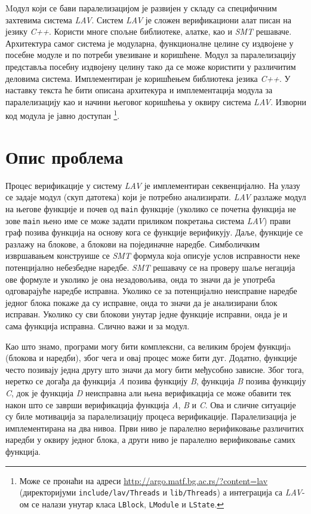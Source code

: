 \documentclass[12pt,oneside]{memoir}
\begin{document}
Mодул који се бави паралелизацијом је развијен у складу са специфичним захтевима система \textit{LAV}. Систем \textit{LAV} је сложен верификациони алат писан на језику \textit{C++}. Користи многе спољне библиотеке, алатке, као и \textit{SMT} решаваче.  Архитектура самог система је модуларна, функционалне целине су издвојене у посебне модуле и по потреби увезиване и коришћене. Модул за паралелизацију представља посебну издвојену целину тако да се може користити у различитим деловима система. Имплементиран је коришћењем библиотека језика \textit{C++}. У наставку текста ће бити описана архитекура и имплементација модула за паралелизацију као и начини његовог коришћења у оквиру система \textit{LAV}. Изворни код модула је јавно доступан \footnote{Може се пронаћи на адреси \url{http://argo.matf.bg.ac.rs/?content=lav} (директоријуми \texttt{include/lav/Threads} и \texttt{lib/Threads}) а интеграција са \textit{LAV}-ом се налази унутар класа \texttt{LBlock}, \texttt{LModule} и \texttt{LState}.}.  

\section{Опис проблема}
Процес верификације у систему \textit{LAV} је имплементиран секвенцијално. На улазу се задаје модул (скуп датотека) који је потребно анализирати.  \textit{LAV} разлаже модул на његове функције и почев од \texttt{main} функције (уколико се почетна функција не зове \texttt{main} њено име се може задати приликом покретања система \textit{LAV}) прави граф позива функција  на основу кога се функције верификују. Даље, функције се разлажу на блокове, а блокови на појединачне наредбе. Симболичким извршавањем конструише се \textit{SMT} формула која описује услов исправности неке потенцијално небезбедне наредбе. \textit{SMT} решавачу се на проверу шаље негација ове формуле и уколико је она незадовољива, онда то значи да је употреба одговарајуће наредбе исправна. Уколико се за потенцијално неисправне наредбе једног блока покаже да су исправне, онда то значи да је анализирани блок исправан. Уколико су сви блокови унутар једне функције исправни, онда је и сама функција исправна. Слично важи и за модул. 

Као што знамо, програми могу бити комплексни, са великим бројем функцијa (блокова и наредби), због чега и овај процес може бити дуг. Додатно, функције често позивају једна другу што значи да могу бити међусобно зависне. Због тога, неретко се догађа да функција \textit{A} позива функцију \textit{B}, функција \textit{B} позива функцију \textit{C}, док је функција \textit{D} неисправна али њена верификација се може обавити тек након што се заврши верификација функција \textit{A}, \textit{B} и \textit{C}. Ова и сличне ситуације су биле мотивација за паралелизацију процеса верификације. Паралелизација је имплементирана на два нивоа. Први ниво је паралелно верификовање различитих наредби у оквиру једног блока, а други ниво је паралелно верификовање самих функција.
\end{document}
